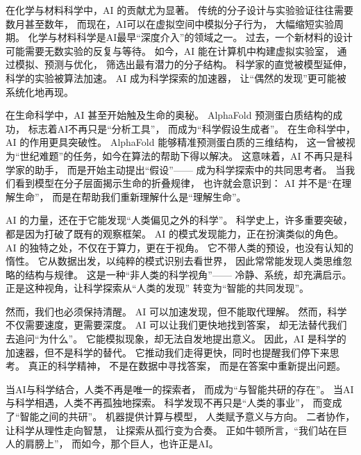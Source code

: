 在化学与材料科学中，AI 的贡献尤为显著。  
传统的分子设计与实验验证往往需要数月甚至数年，  
而现在，AI可以在虚拟空间中模拟分子行为，  
大幅缩短实验周期。  
化学与材料科学是AI最早“深度介入”的领域之一。  
过去，一个新材料的设计可能需要无数实验的反复与等待。  
如今，AI 能在计算机中构建虚拟实验室，  
通过模拟、预测与优化，  
筛选出最有潜力的分子结构。  
科学家的直觉被模型延伸，  
科学的实验被算法加速。  
AI 成为科学探索的加速器，  
让“偶然的发现”更可能被系统化地再现。

在生命科学中，AI 甚至开始触及生命的奥秘。  
AlphaFold 预测蛋白质结构的成功，  
标志着AI不再只是“分析工具”，  
而成为“科学假设生成者”。  
在生命科学中，AI 的作用更具突破性。  
AlphaFold 能够精准预测蛋白质的三维结构，  
这一曾被视为“世纪难题”的任务，如今在算法的帮助下得以解决。  
这意味着，AI 不再只是科学家的助手，  
而是开始主动提出“假设”——  
成为科学探索中的共同思考者。  
当我们看到模型在分子层面揭示生命的折叠规律，  
也许就会意识到：  
AI 并不是“在理解生命”，  
而是在帮助我们重新理解什么是“理解生命”。

AI 的力量，还在于它能发现“人类偏见之外的科学”。  
科学史上，许多重要突破，都是因为打破了既有的观察框架。  
AI 的模式发现能力，正在扮演类似的角色。  
AI 的独特之处，不仅在于算力，更在于视角。  
它不带人类的预设，也没有认知的惰性。  
它从数据出发，以纯粹的模式识别去看世界，  
因此常常能发现人类思维忽略的结构与规律。  
这是一种“非人类的科学视角”——  
冷静、系统，却充满启示。  
正是这种视角，让科学探索从“人类的发现”  
转变为“智能的共同发现”。

然而，我们也必须保持清醒。  
AI 可以加速发现，但不能取代理解。  
然而，科学不仅需要速度，更需要深度。  
AI 可以让我们更快地找到答案，  
却无法替代我们去追问“为什么”。  
它能模拟现象，却无法自发地提出意义。  
因此，AI 是科学的加速器，但不是科学的替代。  
它推动我们走得更快，同时也提醒我们停下来思考。  
真正的科学精神，  
不是在数据中寻找答案，  
而是在答案中重新提出问题。

当AI与科学结合，人类不再是唯一的探索者，  
而成为“与智能共研的存在”。  
当AI与科学相遇，人类不再孤独地探索。  
科学发现不再只是“人类的事业”，  
而变成了“智能之间的共研”。  
机器提供计算与模型，  
人类赋予意义与方向。  
二者协作，让科学从理性走向智慧，  
让探索从孤行变为合奏。  
正如牛顿所言，“我们站在巨人的肩膀上”，  
而如今，那个巨人，也许正是AI。



